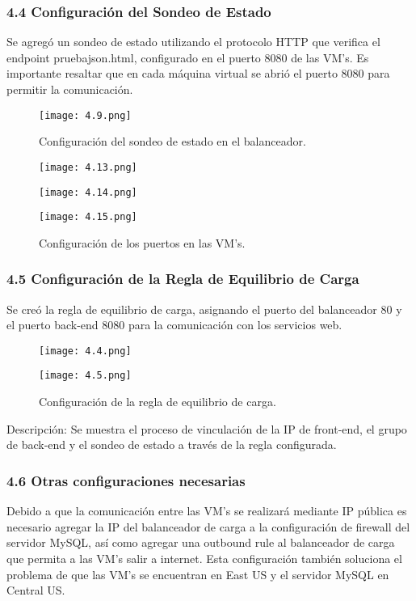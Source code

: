 \documentclass[12pt]{article}
\begin{document}
\subsubsection{4.4 Configuración del Sondeo de Estado}
Se agregó un sondeo de estado utilizando el protocolo HTTP que verifica el endpoint prueba\textunderscore json.html, configurado en el puerto 8080 de las VM's. Es importante resaltar que en cada máquina virtual se abrió el puerto 8080 para permitir la comunicación.

\begin{figure}[H]
    \centering
    \texttt{[image: 4.9.png]}
    \caption{Configuración del sondeo de estado en el balanceador.}
\end{figure}

\begin{figure}[H]
    \centering
    \texttt{[image: 4.13.png]}
\end{figure}
\begin{figure}[H]
    \centering
    \texttt{[image: 4.14.png]}
\end{figure}
\begin{figure}[H]
    \centering
    \texttt{[image: 4.15.png]}
    \caption{Configuración de los puertos en las VM's.}
\end{figure}

\subsubsection{4.5 Configuración de la Regla de Equilibrio de Carga}
Se creó la regla de equilibrio de carga, asignando el puerto del balanceador 80 y el puerto back-end 8080 para la comunicación con los servicios web.
\begin{figure}[H]
    \centering
    \texttt{[image: 4.4.png]}
\end{figure}
\begin{figure}[H]
    \centering
    \texttt{[image: 4.5.png]}
    \caption{Configuración de la regla de equilibrio de carga.}
\end{figure}

Descripción: Se muestra el proceso de vinculación de la IP de front-end, el grupo de back-end y el sondeo de estado a través de la regla configurada.

\subsubsection{4.6 Otras configuraciones necesarias}
Debido a que la comunicación entre las VM's se realizará mediante IP pública es necesario agregar la IP del balanceador de carga a la configuración de firewall del servidor MySQL, así como agregar una outbound rule al balanceador de carga que permita a las VM's salir a internet. Esta configuración también soluciona el problema de que las VM's se encuentran en East US y el servidor MySQL en Central US.
\end{document}
